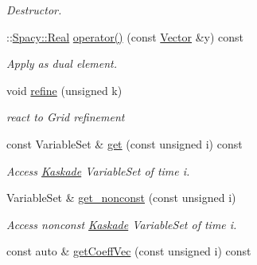 \begin{DoxyCompactItemize}
\begin{DoxyCompactList}\small\item\em Destructor. \end{DoxyCompactList}\item 
\-::\hyperlink{classSpacy_1_1Real}{Spacy\-::\-Real} \hyperlink{classSpacy_1_1KaskadeParabolic_1_1Vector_a6c520a26aa9a1b719c5a13bb1c98752d}{operator()} (const \hyperlink{classSpacy_1_1KaskadeParabolic_1_1Vector}{Vector} \&y) const 
\begin{DoxyCompactList}\small\item\em Apply as dual element. \end{DoxyCompactList}\item 
void \hyperlink{classSpacy_1_1KaskadeParabolic_1_1Vector_a3f0552822824b3b5629ba27f4ed931f6}{refine} (unsigned k)
\begin{DoxyCompactList}\small\item\em react to Grid refinement \end{DoxyCompactList}\item 
\hypertarget{classSpacy_1_1KaskadeParabolic_1_1Vector_aa38f1c317572a12c70588a077d0a4168}{const Variable\-Set \& \hyperlink{classSpacy_1_1KaskadeParabolic_1_1Vector_aa38f1c317572a12c70588a077d0a4168}{get} (const unsigned i) const }\label{classSpacy_1_1KaskadeParabolic_1_1Vector_aa38f1c317572a12c70588a077d0a4168}

\begin{DoxyCompactList}\small\item\em Access \hyperlink{namespaceSpacy_1_1Kaskade}{Kaskade} Variable\-Set of time i. \end{DoxyCompactList}\item 
\hypertarget{classSpacy_1_1KaskadeParabolic_1_1Vector_aaf80937ced2e9b630cb22b1410c66995}{Variable\-Set \& \hyperlink{classSpacy_1_1KaskadeParabolic_1_1Vector_aaf80937ced2e9b630cb22b1410c66995}{get\-\_\-nonconst} (const unsigned i)}\label{classSpacy_1_1KaskadeParabolic_1_1Vector_aaf80937ced2e9b630cb22b1410c66995}

\begin{DoxyCompactList}\small\item\em Access nonconst \hyperlink{namespaceSpacy_1_1Kaskade}{Kaskade} Variable\-Set of time i. \end{DoxyCompactList}\item 
\hypertarget{classSpacy_1_1KaskadeParabolic_1_1Vector_a92434582f61c82bec9e682558a022a72}{const auto \& \hyperlink{classSpacy_1_1KaskadeParabolic_1_1Vector_a92434582f61c82bec9e682558a022a72}{get\-Coeff\-Vec} (const unsigned i) const }\label{classSpacy_1_1KaskadeParabolic_1_1Vector_a92434582f61c82bec9e682558a022a72}


\end{DoxyCompactItemize}
